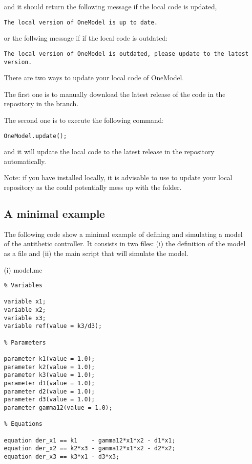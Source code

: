 \documentclass[11pt]{article}
\begin{document}
and it should return the following message if the local code is updated,

\begin{lstlisting}
The local version of OneModel is up to date.
\end{lstlisting}

or the follwing message if if the local code is outdated:

\begin{lstlisting}
The local version of OneModel is outdated, please update to the latest version.
\end{lstlisting}

There are two ways to update your local code of OneModel.

The first one is to manually download the latest release of the code in the repository in the  branch.

The second one is to execute the following command:

\begin{lstlisting}
OneModel.update();
\end{lstlisting}

and it will update the local code to the latest release in the repository automatically. 

Note: if you have  installed locally, it is advisable to use  to update your local repository as the  could potentially mess up with the  folder.

\subsection{A minimal example}

The following code show a minimal example of defining and simulating a model of the antithetic controller. It consists in two files: (i) the definition of the model as a  file and (ii) the main script that will simulate the model. 

(i) model.mc 

\begin{lstlisting}
% Variables

variable x1;
variable x2;
variable x3;
variable ref(value = k3/d3);

% Parameters

parameter k1(value = 1.0);
parameter k2(value = 1.0);
parameter k3(value = 1.0);
parameter d1(value = 1.0);
parameter d2(value = 1.0);
parameter d3(value = 1.0);
parameter gamma12(value = 1.0);

% Equations

equation der_x1 == k1    - gamma12*x1*x2 - d1*x1;
equation der_x2 == k2*x3 - gamma12*x1*x2 - d2*x2;
equation der_x3 == k3*x1 - d3*x3;
\end{lstlisting}
\end{document}
